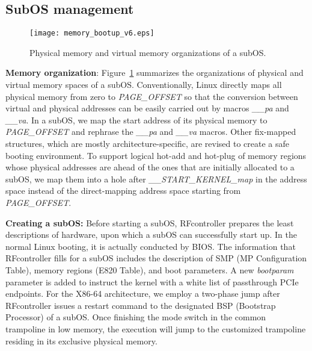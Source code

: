 \documentclass[pageno]{jpaper}
\begin{document}
\subsection{SubOS management}\label{subos_management}




\begin{figure}[t]
\setlength{\abovecaptionskip}{3pt}
\setlength{\belowcaptionskip}{0pt}
  \centering
  \texttt{[image: memory\_bootup\_v6.eps]}
  \caption{Physical memory and virtual memory organizations of a subOS.}
  \label{fig_bootup}
\end{figure}

\textbf{Memory organization}: Figure~\ref{fig_bootup} summarizes the organizations of physical and virtual memory spaces of a subOS. Conventionally, Linux directly maps all physical memory from zero to \emph{PAGE\_OFFSET} so that the conversion between virtual and physical addresses can be easily carried out by macros \emph{\_\_pa} and \emph{\_\_va}. In a subOS, we map the start address of its physical memory to \emph{PAGE\_OFFSET} and rephrase the \emph{\_\_pa} and \emph{\_\_va} macros. Other fix-mapped structures, which are mostly architecture-specific, are revised to create a safe booting environment. To support logical hot-add and hot-plug of memory regions whose physical addresses are ahead of the ones that are initially allocated to a subOS, we map them into a hole after \emph{\_\_START\_KERNEL\_map} in the address space instead of the direct-mapping address space starting from \emph{PAGE\_OFFSET}.






\textbf{Creating a subOS:} Before starting a subOS, RFcontroller prepares the least descriptions of hardware, upon which a subOS can successfully start up. In the normal Linux booting, it is actually conducted by BIOS. The information that RFcontroller fills for a subOS includes the description of SMP (MP Configuration Table), memory regions (E820 Table), and boot parameters. A new \emph{bootparam} parameter is added to instruct the kernel with a white list of passthrough PCIe endpoints. For the X86-64 architecture, we employ a two-phase jump after RFcontroller issues a restart command to the designated BSP (Bootstrap Processor) of a subOS. Once finishing the mode switch in the common trampoline in low memory, the execution will jump to the customized trampoline residing in its exclusive physical memory.
\end{document}
